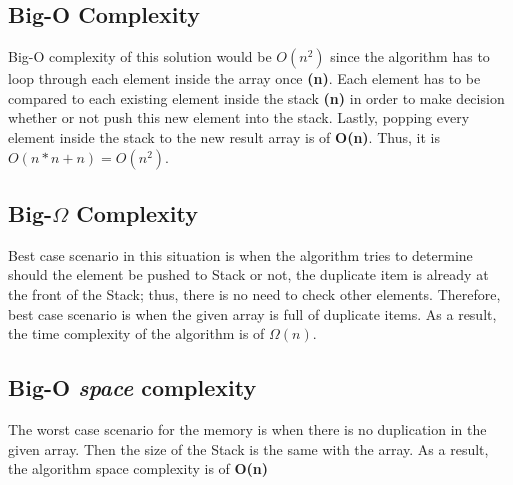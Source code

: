 \documentclass[16pt, letterpaper]{article}
\begin{document}
\subsection{Big-O Complexity}
Big-O complexity of this solution would be $O(n^2)$ since the algorithm has to loop through each element inside the array once \textbf{(n)}. Each element has to be compared to each existing element inside the stack \textbf{(n)} in order to make decision whether or not push this new element into the stack. Lastly, popping every element inside the stack to the new result array is of \textbf{O(n)}. Thus, it is $O(n*n + n) = O(n^2)$.

\subsection{Big-$\Omega$ Complexity}
Best case scenario in this situation is when the algorithm tries to determine should the element be pushed to Stack or not, the duplicate item is already at the front of the Stack; thus, there is no need to check other elements. Therefore, best case scenario is when the given array is full of duplicate items. As a result, the time complexity of the algorithm is of $\Omega(n)$.

\subsection{Big-O \emph{space} complexity}
The worst case scenario for the memory is when there is no duplication in the given array. Then the size of the Stack is the same with the array. As a result, the algorithm space complexity is of \textbf{O(n)}
\end{document}
